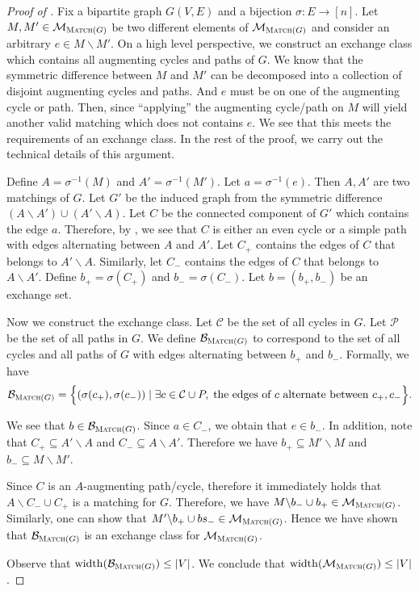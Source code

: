 \documentclass{article}
\newcommand{\M}{\mathcal M}
\newcommand{\B}{\mathcal B}
\newcommand{\del}{\backslash}
\DeclareMathOperator{\rank}{width}
\newcommand{\Match}{\textsc{Match}\xspace}
\begin{document}
\begin{proof}[Proof of ]
Fix  a bipartite graph $G(V,E)$ and a bijection $\sigma\colon E\rightarrow [n]$. 
Let $M,M' \in \M_{\Match(G)}$ be two different elements of $\M_{\Match(G)}$ and consider an arbitrary $e\in M\del M'$.
On a high level perspective, we construct an exchange class which contains all augmenting cycles and paths of $G$.
We know that the symmetric difference between $M$ and $M'$ can be decomposed into a collection of disjoint augmenting cycles and paths. 
And $e$ must be on one of the augmenting cycle or path. 
Then, since ``applying'' the augmenting cycle/path on $M$ will yield another valid matching which does not contains $e$. 
We see that this meets the requirements of an exchange class.
In the rest of the proof, we carry out the technical details of this argument.



Define $A=\sigma^{-1}(M)$ and $A'=\sigma^{-1}(M')$. 
Let $a=\sigma^{-1}(e)$.
Then $A,A'$ are two matchings of $G$. 
Let $G'$ be the induced graph from the symmetric difference $(A\del A')\cup(A'\del A)$.
Let $C$ be the connected component of $G'$ which contains the edge $a$.
Therefore, by , we see that $C$ is either an even cycle or a  simple path with edges alternating between $A$ and $A'$.
Let $C_+$ contains the edges of $C$ that belongs to $A'\del A$.
Similarly, let $C_-$ contains the edges of $C$ that belongs to $A\del A'$.
Define $b_+ = \sigma(C_+)$ and $b_-=\sigma(C_-)$.
Let $b=(b_+,b_-)$ be an exchange set.


Now we construct the exchange class.
Let $\mathcal C$ be the set of all cycles in $G$.
Let $\mathcal P$ be the set of all paths in $G$.
We define $\B_{\Match(G)}$ to correspond to the set of all cycles and all paths of $G$ with edges alternating between $b_+$ and $b_-$.
Formally, we have
$$
\B_{\Match(G)} = \Big\{(\sigma(c_+),\sigma(c_-)) \mid \exists c\in \mathcal C\cup P,\; \text{the edges of }c\text{ alternate between } c_+,c_-\Big\}.
$$

We see that $b\in \B_{\Match(G)}$.
Since $a\in C_-$, we obtain that $e\in b_-$.
In addition, note that $C_+ \subseteq A'\del A$ and $C_- \subseteq A\del A'$.
Therefore we have $b_+ \subseteq M'\del M$ and $b_- \subseteq M\del M'$.

Since $C$ is an $A$-augmenting path/cycle, therefore it immediately holds that $A\del C_-\cup C_+$ is a matching for $G$.
Therefore, we have $M\del b_- \cup b_+ \in \M_{\Match(G)}$.
Similarly, one can show that $M'\del b_+ \cup bs_-\in \M_{\Match(G)}$.
Hence we have shown that $\B_{\Match(G)}$ is an exchange class for $\M_{\Match(G)}$.

Observe that $\rank(\B_{\Match(G)}) \le |V|$. We conclude that $\rank(\M_{\Match(G)}) \le |V|$.
\end{proof}
\end{document}

